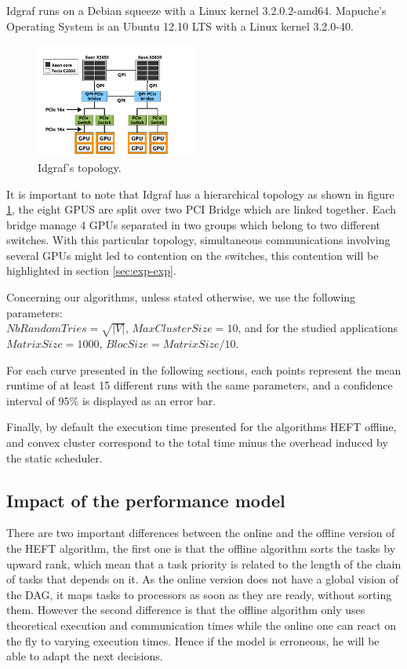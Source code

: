 \documentclass[10pt, conference, compsocconf,pdftex,dvipsnames]{IEEEtran}
\newcommand{\mytodo}[1]{\todo[inline]{#1}}
\begin{document}
Idgraf runs on a Debian squeeze with a Linux kernel
3.2.0.2-amd64. Mapuche's Operating System is an Ubuntu 12.10 LTS with a
Linux kernel 3.2.0-40. 


\begin{figure}[htb]
    \centering
    \includegraphics[width=0.48\textwidth]{idgraf-topo-2012.pdf}
    \caption{Idgraf's topology\cite{gautierxkaapi}.}
    \label{fig:idgraf}
\end{figure}

It is important to note that Idgraf has a hierarchical topology as shown in
figure \ref{fig:idgraf}, the eight GPUS are split over two PCI Bridge which
are linked together. Each bridge manage 4 GPUs separated in two groups which
belong to two different switches. With this particular topology, simultaneous
communications involving several GPUs might led to contention on the switches,
this contention will be highlighted in section \ref{sec:exp-exp}.

Concerning our algorithms, unless stated otherwise, we use the following
parameters:\\
$NbRandomTries=\sqrt{|V|}$, $MaxClusterSize=10$, and for the
studied applications\\
$MatrixSize=1000$, $BlocSize=MatrixSize/10$.

For each curve presented in the following sections, each points represent the
mean runtime of at least 15 different runs with the same parameters, and a
confidence interval of $95\%$ is displayed as an error bar.

Finally, by default the execution time presented for the algorithms HEFT
offline, and convex cluster correspond to the total time minus the overhead
induced by the static scheduler.


\subsection{Impact of the performance model}
\label{sec:exp-exp-perf}
\mytodo{read, Change susbsubsection titles}

There are two important differences between the online and the offline version
of the HEFT algorithm, the first one is that the offline algorithm sorts the tasks
by upward rank, which mean that a task priority is related to the length of
the chain of tasks that depends on it. As the online version does not have a
global vision of the DAG, it maps tasks to processors as soon as they are
ready, without sorting them. However the second difference is that the offline
algorithm only uses theoretical execution and communication times while the
online one can react on the fly to varying execution times. Hence if the model
is erroneous, he will be able to adapt the next decisions. 
\end{document}
